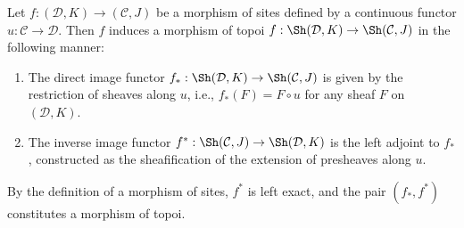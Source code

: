 \begin{proposition} \label{proposition:morphism_of_sites_to_morphism_of_topoi}
    Let $f: (\mathcal{D}, K) \to (\mathcal{C}, J)$ be a morphism of sites defined by a continuous functor $u: \mathcal{C} \to \mathcal{D}$. 
    Then $f$ induces a morphism of topoi $f: \Sh(\mathcal{D}, K) \to \Sh(\mathcal{C}, J)$ in the following manner:
    \begin{enumerate}
        \item The direct image functor $f_*: \Sh(\mathcal{D}, K) \to \Sh(\mathcal{C}, J)$ is given by the restriction of sheaves along $u$, i.e., $f_*(F) = F \circ u$ for any sheaf $F$ on $(\mathcal{D}, K)$.
        \item The inverse image functor $f^*: \Sh(\mathcal{C}, J) \to \Sh(\mathcal{D}, K)$ is the left adjoint to $f_*$, constructed as the sheafification of the extension of presheaves along $u$.
    \end{enumerate}
    By the definition of a morphism of sites, $f^*$ is left exact, and the pair $(f_*, f^*)$ constitutes a morphism of topoi.
\end{proposition}
